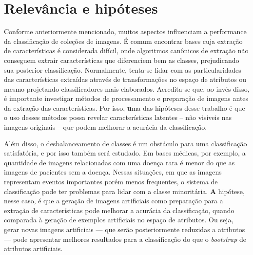 
\section{Relevância e hipóteses}

Conforme anteriormente mencionado, muitos aspectos influenciam a performance da classificação de coleções de imagens. É comum encontrar bases cuja extração de características é considerada difícil, onde algoritmos canônicos de extração não conseguem extrair características que diferenciem bem as classes, prejudicando sua posterior classificação. Normalmente, tenta-se lidar com as particularidades das características extraídas através de transformações no espaço de atributos ou mesmo projetando classificadores mais elaborados. Acredita-se que, ao invés disso, é importante investigar métodos de processamento e preparação de imagens antes da extração das características. Por isso, {\textbf uma das hipóteses desse trabalho é que o uso desses métodos possa revelar características latentes -- não visíveis nas imagens originais -- que podem melhorar a acurácia da classificação.}


Além disso,
o desbalanceamento de classes é um obstáculo para uma classificação satisfatória, e por isso também será estudado.
Em bases médicas, por exemplo, a quantidade de imagens relacionadas com uma doença rara é menor do que as imagens de pacientes sem a doença. Nessas situações, em que as imagens representam eventos importantes porém menos frequentes, o sistema de classificação pode ter problemas para lidar com a classe minoritária. {\textbf A hipótese, nesse caso, é que a geração de imagens artificiais como preparação para a extração de características pode melhorar a acurácia da classificação, quando comparada à geração de exemplos artificiais no espaço de atributos.} Ou seja, gerar novas imagens artificiais — que serão posteriormente reduzidas a atributos — pode apresentar melhores resultados para a classificação do que o \textit{bootstrap} de atributos artificiais.

